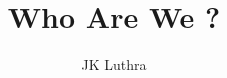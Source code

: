 \documentclass[a5paper,13pt]{memoir}
\begin{document}
\title{Who Are We ?}
\author{JK Luthra}
\date{}
\maketitle
\clearpage

\end{document}
